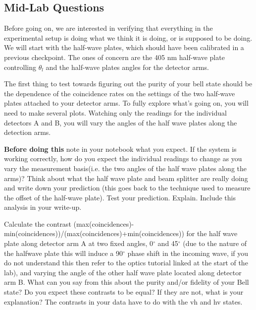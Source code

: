 \documentclass{../lab}
\begin{document}

\subsection{Mid-Lab Questions}

Before going on, we are interested in verifying that everything in the experimental setup is doing what we think it is doing, or is supposed to be doing. We will start with the half-wave plates, which should have been calibrated in a previous checkpoint. The ones of concern are the 405 nm half-wave plate controlling $\theta_l$ and the half-wave plates angles for the detector arms.

The first thing to test towards figuring out the purity of your bell state should be the dependence of the coincidence rates on the settings of the two half-wave plates attached to your detector arms. To fully explore what's going on, you will need to make several plots. Watching only the readings for the individual detectors A and B, you will vary the angles of the half wave plates along the detection arms.

\textbf{Before doing this} note in your notebook what you expect. If the system is working correctly, how do you expect the individual readings to change as you vary the measurement basis(i.e. the two angles of the half wave plates along the arms)? Think about what the half wave plate and beam splitter are really doing and write down your prediction (this goes back to the technique used to measure the offset of the half-wave plate). Test your prediction. Explain. Include this analysis in your write-up.

Calculate the contrast (max(coincidences)-min(coincidences))/(max(coincidences)+min(coincidences)) for the half wave plate along detector arm A at two fixed angles, 0$^\circ$ and 45$^\circ$ (due to the nature of the halfwave plate this will induce a 90$^\circ$ phase shift in the incoming wave, if you do not understand this then refer to the optics tutorial linked at the start of the lab), and varying the angle of the other half wave plate located along detector arm B. What can you say from this about the purity and/or fidelity of your Bell state? Do you expect these contrasts to be equal? If they are not, what is your explanation? The contrasts in your data have to do with the vh and hv states.
\end{document}
